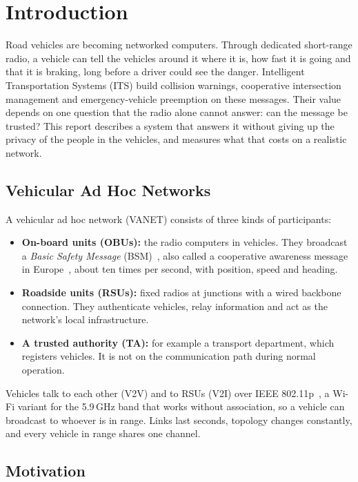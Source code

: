 \chapter{Introduction}\label{ch:intro}

Road vehicles are becoming networked computers. Through dedicated short-range radio, a vehicle can
tell the vehicles around it where it is, how fast it is going and that it is braking, long before a
driver could see the danger. Intelligent Transportation Systems (ITS) build collision warnings,
cooperative intersection management and emergency-vehicle preemption on these messages. Their value
depends on one question that the radio alone cannot answer: can the message be trusted? This report
describes a system that answers it without giving up the privacy of the people in the vehicles, and
measures what that costs on a realistic network.

\section{Vehicular Ad Hoc Networks}

A vehicular ad hoc network (VANET) consists of three kinds of participants:
\begin{itemize}
  \item \textbf{On-board units (OBUs):} the radio computers in vehicles. They broadcast a
  \emph{Basic Safety Message} (BSM)~\cite{saej2735}, also called a cooperative awareness message
  in Europe~\cite{etsi302637}, about ten times per second, with position, speed and heading.
  \item \textbf{Roadside units (RSUs):} fixed radios at junctions with a wired backbone connection.
  They authenticate vehicles, relay information and act as the network's local infrastructure.
  \item \textbf{A trusted authority (TA):} for example a transport department, which registers
  vehicles. It is not on the communication path during normal operation.
\end{itemize}
Vehicles talk to each other (V2V) and to RSUs (V2I) over IEEE 802.11p~\cite{jiang2008wave,kenney2011dsrc},
a Wi-Fi variant for the 5.9\,GHz band that works without association, so a vehicle can broadcast to
whoever is in range. Links last seconds, topology changes constantly, and every vehicle in range shares one channel.

\section{Motivation}

